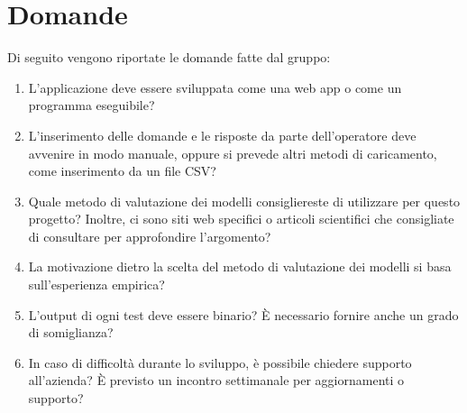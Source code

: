 \documentclass[a4paper, 12pt]{article}
\begin{document}
\section{Domande}
Di seguito vengono riportate le domande fatte dal gruppo:
\begin{enumerate}
    \item L'applicazione deve essere sviluppata come una web app o come un programma eseguibile?
    \item L'inserimento delle domande e le risposte da parte dell'operatore deve avvenire in modo manuale, oppure si prevede altri metodi di caricamento, come inserimento da un file CSV?
    \item Quale metodo di valutazione dei modelli consigliereste di utilizzare per questo progetto? Inoltre, ci sono siti web specifici o articoli scientifici che consigliate di consultare per approfondire l'argomento?
    \item La motivazione dietro la scelta del metodo di valutazione dei modelli si basa sull'esperienza empirica? 
    \item L'output di ogni test deve essere binario? È necessario fornire anche un grado di somiglianza?
    \item In caso di difficoltà durante lo sviluppo, è possibile chiedere supporto all'azienda? È previsto un incontro settimanale per aggiornamenti o supporto?
\end{enumerate}
\end{document}
